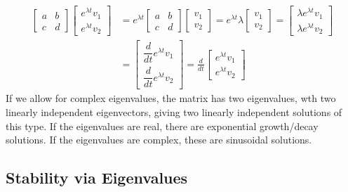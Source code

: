 \documentclass[fleqn,letterpaper]{report}
\begin{document}
\begin{align*}
\left[ \begin{matrix} a & b \\ c & d \end{matrix} \right]
\left[ \begin{matrix} e^{\lambda t} v_1 \\ 
e^{\lambda t} v_2 \end{matrix} \right]
& = e^{\lambda t} \left[ \begin{matrix} a & b \\ c & d
\end{matrix} \right] \left[ \begin{matrix} v_1 \\ v_2
\end{matrix} \right] 
= e^{\lambda t} \lambda \left[ \begin{matrix} v_1 \\ v_2
\end{matrix} \right] 
= \left[ \begin{matrix} \lambda e^{\lambda t} v_1 \\ \lambda
e^{\lambda t} v_2 \end{matrix} \right] \\[1em]
& = \left[ \begin{matrix} \dfrac{d}{dt}e^{\lambda t} v_1
\\[1em]
\dfrac{d}{dt} e^{\lambda t} v_2 \end{matrix} \right] 
= \frac{d}{dt} \left[ \begin{matrix} e^{\lambda t} v_1 \\
e^{\lambda t} v_2 \end{matrix} \right]
\end{align*} 
If we allow for complex eigenvalues, the matrix has two
eigenvalues, wth two linearly independent eigenvectors, giving
two linearly independent solutions of this type. If the
eigenvalues are real, there are exponential growth/decay
solutions. If the eigenvalues are complex, these are
sinusoidal solutions.

\subsection{Stability via Eigenvalues}
\label{stability-eigenvalues}
\end{document}
